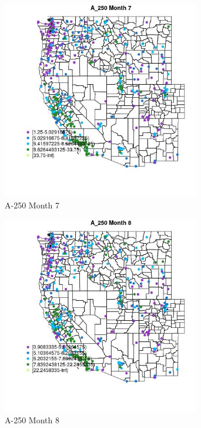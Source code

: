 \begin{figure} 
\centering  
\includegraphics[width=0.77\textwidth]{Code_Outputs/ML_input_report_ML_input_PM25_Step5_part_d_de_duplicated_aves_ML_input_MapObsMo7A_250.jpg} 
\caption{\label{fig:ML_input_report_ML_input_PM25_Step5_part_d_de_duplicated_aves_ML_inputMapObsMo7A_250}A-250 Month 7} 
\end{figure} 
 

\begin{figure} 
\centering  
\includegraphics[width=0.77\textwidth]{Code_Outputs/ML_input_report_ML_input_PM25_Step5_part_d_de_duplicated_aves_ML_input_MapObsMo8A_250.jpg} 
\caption{\label{fig:ML_input_report_ML_input_PM25_Step5_part_d_de_duplicated_aves_ML_inputMapObsMo8A_250}A-250 Month 8} 
\end{figure} 
 

